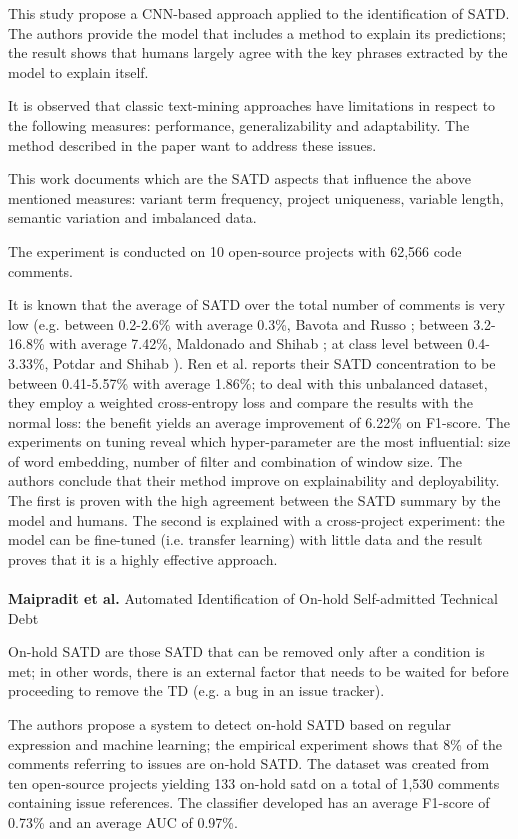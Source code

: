 This study propose a CNN-based approach applied to the identification of SATD. The authors provide the model that includes a method to explain its predictions; the result shows that humans largely agree with the key phrases extracted by the model to explain itself.

It is observed that classic text-mining approaches have limitations in respect to the following measures: performance, generalizability and adaptability. The method described in the paper want to address these issues.

This work documents which are the SATD aspects that influence the above mentioned measures: variant term frequency, project uniqueness, variable length, semantic variation and imbalanced data.

The experiment is conducted on 10 open-source projects with 62,566 code comments.

It is known that the average of SATD over the total number of comments is very low (e.g. between 0.2-2.6\% with average 0.3\%, Bavota and Russo \cite{bavota2016large}; between 3.2-16.8\% with average 7.42\%, Maldonado and Shihab \cite{maldonado2015detecting}; at class level between 0.4-3.33\%, Potdar and Shihab \cite{potdar2014exploratory}). 
Ren et al. reports their SATD concentration to be between 0.41-5.57\% with average 1.86\%; to deal with this unbalanced dataset, they employ a weighted cross-entropy loss and compare the results with the normal loss: the benefit yields an average improvement of 6.22\% on F1-score.
The experiments on tuning reveal which hyper-parameter are the most influential: size of word embedding, number of filter and combination of window size.
The authors conclude that their method improve on explainability and deployability. The first is proven with the high agreement between the SATD summary by the model and humans. The second is explained with a cross-project experiment: the model can be fine-tuned (i.e. transfer learning) with little data and the result proves that it is a highly effective approach.
\\
\\
\textbf{Maipradit et al.} \cite{maipradit2020automated} Automated Identification of On-hold Self-admitted Technical Debt

On-hold SATD are those SATD that can be removed only after a condition is met; in other words, there is an external factor that needs to be waited for before proceeding to remove the TD (e.g. a bug in an issue tracker). 

The authors propose a system to detect on-hold SATD based on regular expression and machine learning; the empirical experiment shows that 8\% of the comments referring to issues are on-hold SATD. The dataset was created from ten open-source projects yielding 133 on-hold satd on a total of 1,530 comments containing issue references.
The classifier developed has an average F1-score of 0.73\% and an average AUC of 0.97\%. 

